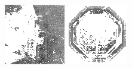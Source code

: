 \documentclass{article}
\begin{document}
\begin{figure}[t]
\begin{minipage}[c]{.21\linewidth}
  \end{minipage}
  \begin{minipage}[c]{.21\linewidth}
    \centering\centerline{\includegraphics[width=\linewidth]{imgs/dennis_cal/saxophone/sums/100_201.png}}
  \end{minipage}
  \begin{minipage}[c]{.21\linewidth}
    \centering\centerline{\includegraphics[width=\linewidth]{imgs/dennis_cal/stop/sums/100_201.png}}

\end{minipage}
\end{figure}
\end{document}
